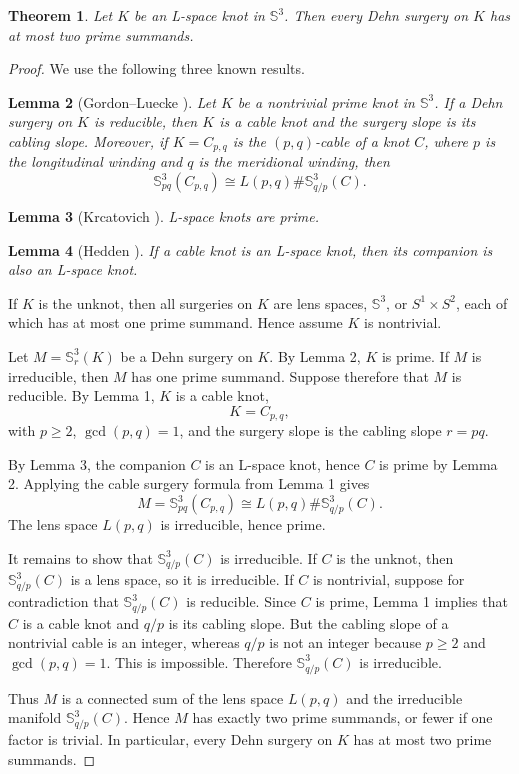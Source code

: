 \documentclass[12pt]{article}
\newtheorem{theorem}{Theorem}
\newtheorem{lemma}[theorem]{Lemma}
\newcommand{\Sp}{\mathbb{S}^3}
\begin{document}
\begin{theorem}
Let $K$ be an L-space knot in $\Sp$. Then every Dehn surgery on $K$ has at most two prime summands.
\end{theorem}

\begin{proof}
We use the following three known results.

\begin{lemma}[Gordon--Luecke \cite{GL}]
Let $K$ be a nontrivial prime knot in $\Sp$. If a Dehn surgery on $K$ is reducible, then $K$ is a cable knot and the surgery slope is its cabling slope.
Moreover, if $K=C_{p,q}$ is the $(p,q)$-cable of a knot $C$, where $p$ is the longitudinal winding and $q$ is the meridional winding, then
\[
\Sp_{pq}(C_{p,q}) \cong L(p,q) \# \Sp_{q/p}(C).
\]
\end{lemma}

\begin{lemma}[Krcatovich \cite{Krc}]
L-space knots are prime.
\end{lemma}

\begin{lemma}[Hedden \cite{Hedden}]
If a cable knot is an L-space knot, then its companion is also an L-space knot.
\end{lemma}

If $K$ is the unknot, then all surgeries on $K$ are lens spaces, $\Sp$, or $S^1\times S^2$, each of which has at most one prime summand. Hence assume $K$ is nontrivial.

Let $M=\Sp_r(K)$ be a Dehn surgery on $K$. By Lemma 2, $K$ is prime. If $M$ is irreducible, then $M$ has one prime summand. Suppose therefore that $M$ is reducible. By Lemma 1, $K$ is a cable knot,
\[
K=C_{p,q},
\]
with $p\ge 2$, $\gcd(p,q)=1$, and the surgery slope is the cabling slope $r=pq$.

By Lemma 3, the companion $C$ is an L-space knot, hence $C$ is prime by Lemma 2. Applying the cable surgery formula from Lemma 1 gives
\[
M=\Sp_{pq}(C_{p,q})\cong L(p,q)\# \Sp_{q/p}(C).
\]
The lens space $L(p,q)$ is irreducible, hence prime.

It remains to show that $\Sp_{q/p}(C)$ is irreducible. If $C$ is the unknot, then $\Sp_{q/p}(C)$ is a lens space, so it is irreducible. If $C$ is nontrivial, suppose for contradiction that $\Sp_{q/p}(C)$ is reducible. Since $C$ is prime, Lemma 1 implies that $C$ is a cable knot and $q/p$ is its cabling slope. But the cabling slope of a nontrivial cable is an integer, whereas $q/p$ is not an integer because $p\ge 2$ and $\gcd(p,q)=1$. This is impossible. Therefore $\Sp_{q/p}(C)$ is irreducible.

Thus $M$ is a connected sum of the lens space $L(p,q)$ and the irreducible manifold $\Sp_{q/p}(C)$. Hence $M$ has exactly two prime summands, or fewer if one factor is trivial. In particular, every Dehn surgery on $K$ has at most two prime summands.
\end{proof}
\end{document}
